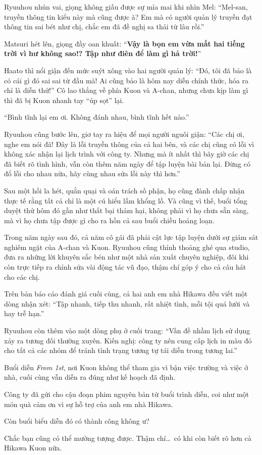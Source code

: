 \documentclass[../main.tex]{subfiles}
\begin{document}
Ryuuhou nhún vai, giọng không giấu được sự mỉa mai khi nhìn Mel: ``Mel-san, truyền thông tin kiểu này mà cũng được à? Em mà có người quản lý truyền đạt thông tin sai bét như chị, chắc em đã đề nghị sa thải từ lâu rồi.''

Matsuri hét lên, giọng đầy oan khuất: ``\textbf{Vậy là bọn em vừa mất hai tiếng trời vì hư không sao!? Tập như điên để làm gì hả trời!}''

Haato thì nổi giận đến mức suýt xông vào hai người quản lý: ``Đó, tôi đã bảo là có cái gì đó sai sai từ đầu mà! Ai cũng bảo là hôm nay diễn chính thức, hóa ra chỉ là diễn thử!'' Cô lao thẳng về phía Kuon và A-chan, nhưng chưa kịp làm gì thì đã bị Kuon nhanh tay ``úp sọt'' lại.

``Bình tĩnh lại em ơi. Không đánh nhau, bình tĩnh hết nào.''

Ryuuhou cũng bước lên, giơ tay ra hiệu để mọi người nguôi giận: ``Các chị ơi, nghe em nói đã! Đây là lỗi truyền thông của cả hai bên, và các chị cũng có lỗi vì không xác nhận lại lịch trình với công ty. Nhưng mà ít nhất thì bây giờ các chị đã biết rõ tình hình, vẫn còn thêm năm ngày để tập luyện bài bản lại. Đừng có đổ lỗi cho nhau nữa, hãy cùng nhau sửa lỗi này thì hơn.''

Sau một hồi la hét, quằn quại và oán trách số phận, họ cũng đành chấp nhận thực tế rằng tất cả chỉ là một cú hiểu lầm khổng lồ. Và cũng vì thế, buổi tổng duyệt thử hôm đó gần như thất bại thảm hại, không phải vì họ chưa sẵn sàng, mà vì họ chưa tập được gì cho ra hồn cả sau buổi chiều hoảng loạn.

Trong năm ngày sau đó, cả năm cô gái đã phải cật lực tập luyện dưới sự giám sát nghiêm ngặt của A-chan và Kuon. Ryuuhou cũng thỉnh thoảng ghé qua studio, đưa ra những lời khuyên sắc bén như một nhà sản xuất chuyên nghiệp, đôi khi còn trực tiếp ra chỉnh sửa vài động tác vũ đạo, thậm chí góp ý cho cả câu hát cho các chị.

Trên bản báo cáo đánh giá cuối cùng, cả hai anh em nhà Hikawa đều viết một dòng nhận xét: ``Tập nhanh, tiếp thu nhanh, rất nhiệt tình, mỗi tội quá lười và hay trễ hạn.''

Ryuuhou còn thêm vào một dòng phụ ở cuối trang: ``Vấn đề nhầm lịch sử dụng xảy ra tương đối thường xuyên. Kiến nghị: công ty nên cung cấp lịch in màu đỏ cho tất cả các nhóm để tránh tình trạng tương tự tái diễn trong tương lai.''

\il

Buổi diễn \textit{From 1st}, nơi Kuon không thể tham gia vì bận việc trường và việc ở nhà, cuối cùng vẫn diễn ra đúng như kế hoạch đã định.

Công ty đã gửi cho cậu đoạn phim nguyên bản từ buổi trình diễn, coi như một món quà cảm ơn vì sự hỗ trợ của anh em nhà Hikawa.

Còn buổi biểu diễn đó có thành công không ư?

Chắc bạn cũng có thể mường tượng được. Thậm chí\dots\ có khi còn biết rõ hơn cả Hikawa Kuon nữa.
\end{document}
